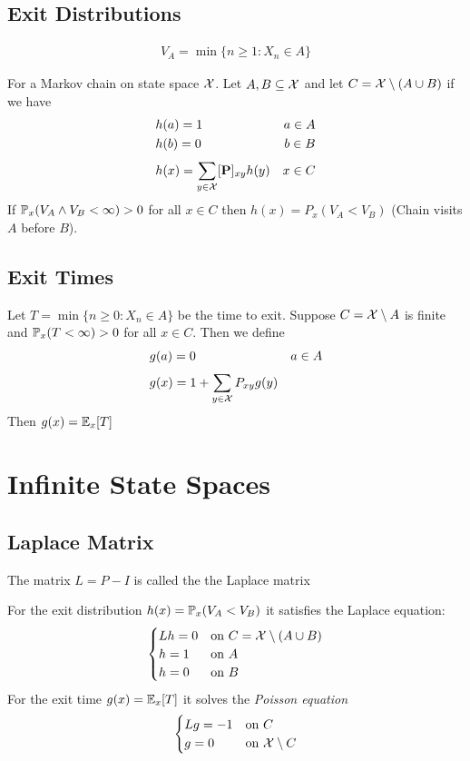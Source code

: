 \documentclass[12pt,a4paper]{article}
\begin{document}
\subsection{Exit Distributions}
\begin{defn}
\begin{align*}
V_A = \min \{n\geq 1 : X_n \in A\}
\end{align*}
\end{defn}
\begin{thm}
For a Markov chain on state space $\cal X$. Let $A, B \subseteq \cal X$ and let $C = {\cal X}\setminus (A\cup B)$ if we have 
\begin{align*}
&h(a) = 1 & a\in A\\
&h(b) = 0 & b\in B\\
&h(x) = \nsum{y\in {\cal X}}{}[\vb P]_{xy}h(y) & x\in C
\end{align*}
If $\P_x(V_A \wedge V_B < \infty) > 0$ for all $x\in C$ then $h(x) = P_x(V_A < V_B)$ (Chain visits $A$ before $B$). 
\end{thm}

\subsection{Exit Times}
\begin{thm}
Let $T = \min\{n\geq 0 : X_n \in A\}$ be the time to exit. Suppose $C = {\cal X}\setminus A$ is finite and $\P_x(T < \infty)>0$ for all $x\in C$. Then we define 
\begin{align*}
&g(a) = 0 & a\in A\\
&g(x) = 1 + \nsum{y\in {\cal X}}{}P_{xy}g(y)
\end{align*}
Then $g(x) = \E_x[T]$
\end{thm}
\newpage
\section{Infinite State Spaces}
\subsection{Laplace Matrix}
\begin{defn}
The matrix $L = P - I$ is called the the Laplace matrix
\end{defn}
For the exit distribution $h(x) = \P_x(V_A < V_B)$ it satisfies the Laplace equation: 
\begin{align*}
\begin{cases}
Lh = 0 & \text{on $C = {\cal X}\setminus (A\cup B)$}\\
h = 1 & \text{on $A$}\\
h = 0 & \text{on $B$}
\end{cases}
\end{align*}
For the exit time $g(x) = \E_x[T]$ it solves the \textit{Poisson equation}
\begin{align*}
\begin{cases}
Lg = -1 & \text{on $C$}\\
g = 0 & \text{on ${\cal X}\setminus C$}
\end{cases}
\end{align*}
\end{document}

